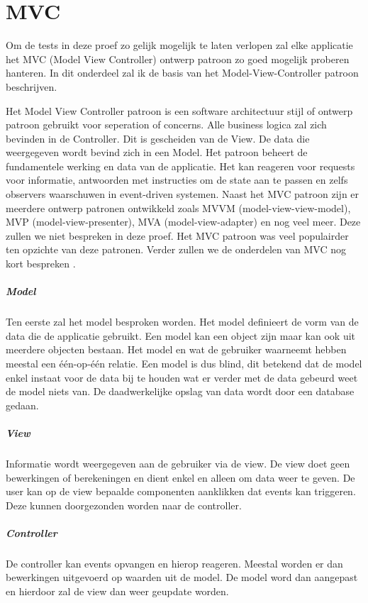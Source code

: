 \section{MVC}
\label{sec:MVC}

Om de tests in deze proef zo gelijk mogelijk te laten verlopen zal elke applicatie het MVC (Model View Controller) ontwerp patroon zo goed mogelijk proberen hanteren. In dit onderdeel zal ik de basis van het Model-View-Controller patroon beschrijven.

Het Model View Controller patroon is een software architectuur stijl of ontwerp patroon gebruikt voor seperation of concerns. Alle business logica zal zich bevinden in de Controller. Dit is gescheiden van de View. De data die weergegeven wordt bevind zich in een Model. Het patroon beheert de fundamentele werking en data van de applicatie. Het kan reageren voor requests voor informatie, antwoorden met instructies om de state aan te passen en zelfs observers waarschuwen in event-driven systemen. Naast het MVC patroon zijn er meerdere ontwerp patronen ontwikkeld zoals MVVM (model-view-view-model), MVP (model-view-presenter), MVA (model-view-adapter) en nog veel meer. Deze zullen we niet bespreken in deze proef. Het MVC patroon was veel populairder ten opzichte van deze patronen. Verder zullen we de onderdelen van MVC nog kort bespreken \autocite{atwood_understanding_2008} \autocite{_model-view-controller_2014}.

\subparagraph{Model}
\label{sec:MVC_Model}
Ten eerste zal het model besproken worden. Het model definieert de vorm van de data die de applicatie gebruikt. Een model kan een object zijn maar kan ook uit meerdere objecten bestaan. Het model en wat de gebruiker waarneemt hebben meestal een één-op-één relatie. Een model is dus blind, dit betekend dat de model enkel instaat voor de data bij te houden wat er verder met de data gebeurd weet de model niets van. De daadwerkelijke opslag van data wordt door een database gedaan.

\subparagraph{View}
\label{sec:MVC_View}
Informatie wordt weergegeven aan de gebruiker via de view. De view doet geen bewerkingen of berekeningen en dient enkel en alleen om data weer te geven. De user kan op de view bepaalde componenten aanklikken dat events kan triggeren. Deze kunnen doorgezonden worden naar de controller.

\subparagraph{Controller}
\label{sec:MVC_Controller}
De controller kan events opvangen en hierop reageren. Meestal worden er dan bewerkingen uitgevoerd op waarden uit de model. De model word dan aangepast en hierdoor zal de view dan weer geupdate worden.








